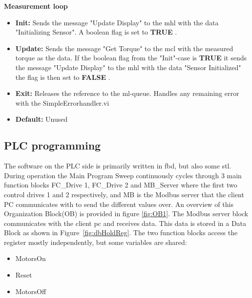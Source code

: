 \documentclass{ol-softwaremanual}
\newcommand{\figref}[1]{Figure~\ref{#1}}
\newcommand{\true}{\textbf{TRUE} }
\newcommand{\false}{\textbf{FALSE} }
\begin{document}
\textbf{Measurement loop}
\begin{itemize}
    \item \textbf{Init:} Sends the message "Update Display" to the \acrshort{mhl} with the data "Initializing Sensor". A boolean flag is set to \true. 
    \item \textbf{Update:} Sends the message "Get Torque" to the \acrshort{mcl} with the measured torque as the data. If the boolean flag from the "Init"-case is \true it sends the message "Update Display" to the \acrshort{mhl} with the data "Sensor Initialized" the flag is then set to \false. 
    \item \textbf{Exit:}  Releases the reference to the \acrshort{ml}-queue. Handles any remaining error with the SimpleErrorhandler.vi
    \item \textbf{Default:} Unused
\end{itemize}

\subsection{PLC programming}
The software on the PLC side is primarily written in \acrshort{fbd}, but also some \acrshort{stl}. During operation the Main Program Sweep continuously cycles through 3 main function blocks FC\_Drive 1, FC\_Drive 2 and MB\_Server where the first two control drives 1 and 2 respectively, and MB is the Modbus server that the client PC communicates with to send the different values over. An overview of this Organization Block(OB) is provided in figure \ref{fig:OB1}. The Modbus server block communicates with the client pc and receives data. This data is stored in a Data Block as shown in \figref{fig:dbHoldReg}. The two function blocks access the register mostly independently, but some variables are shared:
\begin{itemize}
    \item MotorsOn
    \item Reset
    \item MotorsOff
\end{itemize}

\appendix
\end{document}
